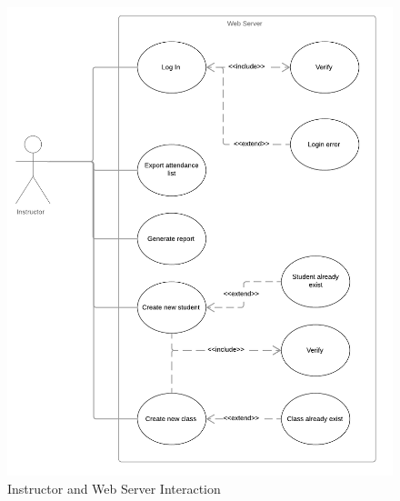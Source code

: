 \documentclass{scrreprt}
\begin{document}
\begin{figure}[H]
 \begin{center}
	\includegraphics[scale=1]{instructor}
  	\caption{Instructor and Web Server Interaction}
  \end{center}
\end{figure}
\end{document}
